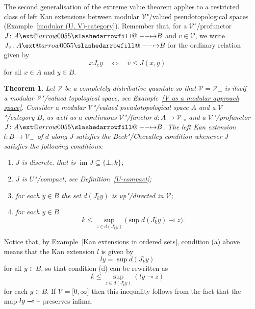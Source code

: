 \documentclass[preprint, a4paper]{elsarticle}
\makeatletter
\def\slashedarrowfill@#1#2#3#4#5{%
  $\m@th\thickmuskip0mu\medmuskip\thickmuskip\thinmuskip\thickmuskip
   \relax#5#1\mkern-7mu%
   \cleaders\hbox{$#5\mkern-2mu#2\mkern-2mu$}\hfill
   \mathclap{#3}\mathclap{#2}%
   \cleaders\hbox{$#5\mkern-2mu#2\mkern-2mu$}\hfill
   \mkern-7mu#4$%
}
\def\rightslashedarrowfill@{%
  \slashedarrowfill@\relbar\relbar\mapstochar\rightarrow}
\newcommand\xslashedrightarrow[2][]{%
  \ext@arrow 0055{\rightslashedarrowfill@}{#1}{#2}}
\def\slashedrightarrow{\xslashedrightarrow{}}
\newcommand{\dashcirc}{\multimap}
\newtheorem{theorem}{Theorem}[section]
\theoremstyle{definition}
\theoremstyle{remark}
\providecommand{\defref}[1]{Definition~\ref{#1}}
\providecommand{\exref}[1]{Example~\ref{#1}}
\renewcommand{\iff}{\Leftrightarrow}
\newcommand{\dash}{\textup{--}}
\providecommand{\brcs}[1]{\lbrace #1 \rbrace}
\providecommand{\brks}[1]{\lbrack #1 \rbrack}
\providecommand{\pars}[1]{\left(#1\right)}
\providecommand{\bigpars}[1]{\bigl(#1\bigr)}
\providecommand{\set}[1]{\brcs{#1}}
\providecommand{\rev}[1]{#1^\circ}
\providecommand{\map}[3]{#1\colon#2\to#3}
\providecommand{\hmap}[3]{#1\colon#2\slashedrightarrow#3}
\DeclareMathOperator{\im}{im}
\providecommand{\catvar}[1]{\mathcal{#1}}
\providecommand{\2}{\mathsf 2}
\providecommand{\V}{\catvar V}
\makeatother
\begin{document}
	The second generalisation of the extreme value theorem applies to a restricted class of left Kan extensions between modular $\V$"/valued pseudotopological spaces (\exref{modular (U, V)-category}). Remember that, for a $\V$"/profunctor $\hmap JAB$ and $v \in \V$, we write $\hmap{J_v}AB$ for the ordinary relation given by
	\begin{displaymath}
		x J_v y \quad \iff \quad v \leq J(x,y)
	\end{displaymath}
	for all $x \in A$ and $y \in B$.
	\begin{theorem} \label{extreme value theorem for modular V-valued pseudotopological spaces}
		Let $\V$ be a completely distributive quantale so that $\V = \V_{\dashcirc}$ is itself a modular $\V$"/valued topological space, see \exref{V as a modular approach space}. Consider a modular $\V$"/valued pseudotopological space $A$ and a $\V$"/category $B$, as well as a continuous $\V$"/functor $\map dA{\V_{\dashcirc}}$ and a $\V$"/profunctor $\hmap JAB$. The left Kan extension $\map lB{\V_{\dashcirc}}$ of $d$ along $J$ satisfies the Beck"/Chevalley condition whenever $J$ satisfies the following conditions:
		\begin{enumerate}[label=\textup{(\alph*)}]
			\item $J$ is discrete, that is $\im J \subseteq \set{\bot, k}$;
			\item $J$ is $U$"/compact, see \defref{U-compact};
			\item for each $y \in B$ the set $d(\rev J_ky)$ is up"/directed in $\V$;
			\item for each $y \in B$
			\begin{displaymath}
				k \leq \sup_{z \in d(\rev J_ky)} \bigpars{\sup d(\rev J_ky) \dashcirc z}.
			\end{displaymath}
		\end{enumerate}
	\end{theorem}
	Notice that, by \exref{Kan extensions in ordered sets}, condition (a) above means that the Kan extension $l$ is given by
	\begin{equation} \label{definition of ly}
		ly = \sup d(\rev J_ky)
	\end{equation}
	for all $y \in B$, so that condition (d) can be rewritten as
	\begin{displaymath}
		k \leq \sup_{z \in d(\rev J_ky)} \pars{ly \dashcirc z}
	\end{displaymath}
	for each $y \in B$. If $\V = \brks{0, \infty}$ then this inequality follows from the fact that the map $ly \dashcirc \dash$ preserves infima.
	
\end{document}
